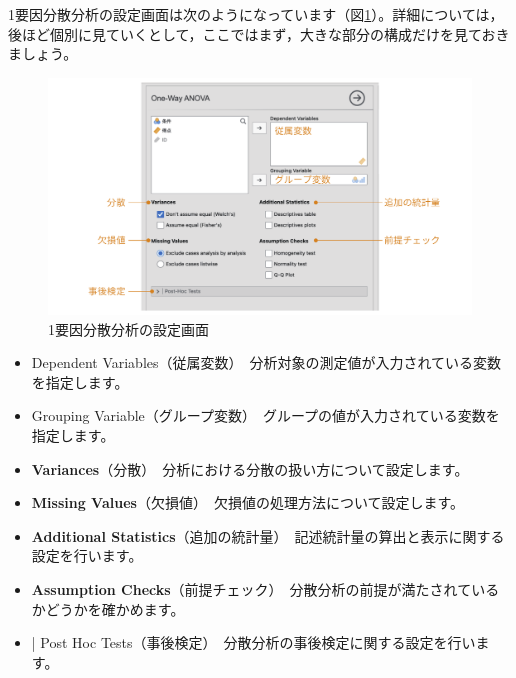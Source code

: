 \documentclass[
  12pt,
  a5jpaper,
  lualatex, ja=standard]{bxjsbook}
\providecommand{\tightlist}{%
  \setlength{\itemsep}{0pt}\setlength{\parskip}{0pt}}
\newenvironment{jmvsettings}{%
	\begin{center}%
	\begin{tcolorbox}[%
		title=設定項目,
		colframe=gmoji,
		colbacktitle=gmoji,
		colback=gmoji!2!white,
		breakable,
		width=.9\textwidth,
		]\small\addtolength{\leftmargini}{-3\labelsep}%
	}%
	{\end{tcolorbox}\end{center}}
\begin{document}
1要因分散分析の設定画面は次のようになっています（図\ref{fig:ANOVA-oneway-settings}）。詳細については，後ほど個別に見ていくとして，ここではまず，大きな部分の構成だけを見ておきましょう。

\begin{figure}[!ht]

{\centering \includegraphics[width=1\linewidth]{images/ANOVA/oneway-settings} 

}

\caption{1要因分散分析の設定画面}\label{fig:ANOVA-oneway-settings}
\end{figure}

\begin{jmvsettings}

\begin{itemize}
\tightlist
\item
  Dependent Variables（従属変数）　分析対象の測定値が入力されている変数を指定します。
\item
  Grouping Variable（グループ変数）　グループの値が入力されている変数を指定します。
\item
  \textbf{Variances}（分散）　分析における分散の扱い方について設定します。
\item
  \textbf{Missing Values}（欠損値）　欠損値の処理方法について設定します。
\item
  \textbf{Additional Statistics}（追加の統計量）　記述統計量の算出と表示に関する設定を行います。
\item
  \textbf{Assumption Checks}（前提チェック）　分散分析の前提が満たされているかどうかを確かめます。
\item
  \colorbox{bar}{\textcolor{gmoji2}{| Post Hoc Tests}}（事後検定）　分散分析の事後検定に関する設定を行います。
\end{itemize}

\end{jmvsettings}
\end{document}
